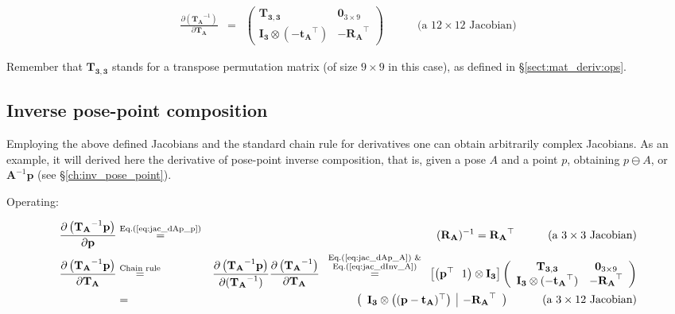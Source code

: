 \documentclass[a4paper,11pt]{report}
\begin{document}
\begin{eqnarray}
\label{eq:jac_dInv_A}
\frac{\partial \left( \mathbf{T_A} ^{-1} \right) }{\partial \mathbf{T_A} } &=& 
\left(
\begin{array}{cc}
 \mathbf{T_{3,3}} & \mathbf{0}_{3 \times 9} \\
 \mathbf{I_3} \otimes (-\mathbf{t_A}^\top) & - \mathbf{R_A}^\top
\end{array}
\right)
\quad \quad \quad
\text{(a $12 \times 12$ Jacobian)}
\end{eqnarray}

Remember that $\mathbf{T_{3,3}}$ stands for a transpose permutation matrix (of size $9 \times 9$ in this case), 
as defined in \S\ref{sect:mat_deriv:ops}.


\subsection{Inverse pose-point composition}

Employing the above defined Jacobians and the standard chain rule for derivatives one can 
obtain arbitrarily complex Jacobians. As an example, it will derived here
the derivative of pose-point inverse composition, that is, 
given a pose $A$ and a point $p$, obtaining $p \ominus A$, or $\mathbf{A}^{-1} \mathbf{p}$ 
(see \S\ref{ch:inv_pose_point}).

Operating:

\begin{eqnarray}
\frac{\partial \left( \mathbf{T_A} ^{-1} \mathbf{p} \right) }{\partial \mathbf{p} } 
&\overset{\text{Eq.(\ref{eq:jac_dAp_p})}}{=}&
(\mathbf{R_A})^{-1}
=\mathbf{R_A}^\top
\quad \quad \quad
\text{(a $3 \times 3$ Jacobian)}
\\
\frac{\partial \left( \mathbf{T_A} ^{-1} \mathbf{p} \right) }{\partial \mathbf{T_A} } 
& \overset{\text{Chain rule}}{=}&
\frac{\partial \left( \mathbf{T_A} ^{-1} \mathbf{p} \right) }{\partial (\mathbf{T_A}^{-1}) } 
\frac{\partial \left( \mathbf{T_A} ^{-1} \right) }{\partial \mathbf{T_A} } 
\overset{ \scriptsize{ \begin{array}{c} \text{Eq.(\ref{eq:jac_dAp_A}) \&} \\  \text{Eq.(\ref{eq:jac_dInv_A})} \end{array} } }
{=}
\left[
\left( \mathbf{p}^\top ~~ 1 \right) \otimes \mathbf{I_3} 
\right]
\left(
\begin{array}{cc}
 \mathbf{T_{3,3}} & \mathbf{0}_{3 \times 9} \\
 \mathbf{I_3} \otimes (-\mathbf{t_A}^\top) & - \mathbf{R_A}^\top
\end{array}
\right)
\\
&=& 
\label{eq:jac_dp_min_A}
\left(
\begin{array}{c|c}
 \mathbf{I_3} \otimes \left( (\mathbf{p}-\mathbf{t_A})^\top \right)
 &
 -\mathbf{R_A}^\top
\end{array}
\right)
\quad \quad \quad
\text{(a $3 \times 12$ Jacobian)}
\end{eqnarray}
\end{document}
